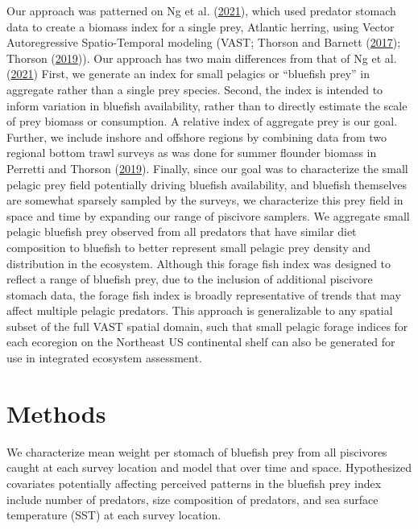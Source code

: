\documentclass[
]{article}
\begin{document}
Our approach was patterned on Ng et al. (\protect\hyperlink{ref-ng_predator_2021}{2021}), which used predator stomach data to create a biomass index for a single prey, Atlantic herring, using Vector Autoregressive Spatio-Temporal modeling (VAST; Thorson and Barnett (\protect\hyperlink{ref-thorson_comparing_2017}{2017}); Thorson (\protect\hyperlink{ref-thorson_guidance_2019}{2019})). Our approach has two main differences from that of Ng et al. (\protect\hyperlink{ref-ng_predator_2021}{2021}) First, we generate an index for small pelagics or ``bluefish prey'' in aggregate rather than a single prey species. Second, the index is intended to inform variation in bluefish availability, rather than to directly estimate the scale of prey biomass or consumption. A relative index of aggregate prey is our goal. Further, we include inshore and offshore regions by combining data from two regional bottom trawl surveys as was done for summer flounder biomass in Perretti and Thorson (\protect\hyperlink{ref-perretti_spatio-temporal_2019}{2019}). Finally, since our goal was to characterize the small pelagic prey field potentially driving bluefish availability, and bluefish themselves are somewhat sparsely sampled by the surveys, we characterize this prey field in space and time by expanding our range of piscivore samplers. We aggregate small pelagic bluefish prey observed from all predators that have similar diet composition to bluefish to better represent small pelagic prey density and distribution in the ecosystem. Although this forage fish index was designed to reflect a range of bluefish prey, due to the inclusion of additional piscivore stomach data, the forage fish index is broadly representative of trends that may affect multiple pelagic predators. This approach is generalizable to any spatial subset of the full VAST spatial domain, such that small pelagic forage indices for each ecoregion on the Northeast US continental shelf can also be generated for use in integrated ecosystem assessment.

\hypertarget{methods}{%
\section{Methods}\label{methods}}

We characterize mean weight per stomach of bluefish prey from all piscivores caught at each survey location and model that over time and space. Hypothesized covariates potentially affecting perceived patterns in the bluefish prey index include number of predators, size composition of predators, and sea surface temperature (SST) at each survey location.
\end{document}
